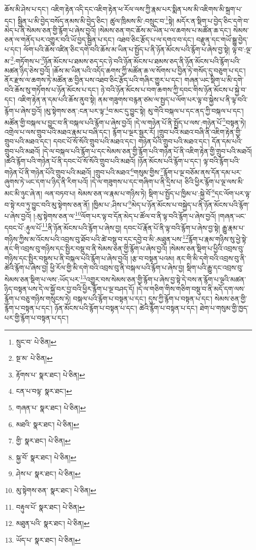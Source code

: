 ཆོས་མི་ཤེས་པ་དང་། འཇིག་རྟེན་འདི་དང་འཇིག་རྟེན་ཕ་རོལ་ལས་ཀྱི་རྣམ་པར་སྨིན་པས་མི་འཇིགས་མི་སྐྲག་པ་དང་། སྦྱིན་པ་མི་བྱེད་བསོད་ནམས་མི་བྱེད་ཅིང་། ཚུལ་ཁྲིམས་མི་:བསྲུང་བ་\footnote{སྲུང་བ་  པེ་ཅིན། }སྟེ། མདོར་ན་སྡིག་པ་བྱེད་ཅིང་དགེ་བ་མེད་པ་ནི་སེམས་ཅན་གྱི་རྙོག་པ་ཞེས་བྱའོ། །སེམས་ཅན་གང་ཆོས་མ་ཡིན་པ་ལ་ཆགས་པ་མཚོན་ཆ་དང་། སེམས་ཅན་ལ་གནོད་པར་འགྱུར་བའི་ཡོ་བྱད་སྦྱིན་པ་དང་། འཐབ་ཅིང་རྩོད་པ་ལ་དགའ་བ་དང་། བརྫུན་དང་གཡོ་སྒྱུ་བྱེད་པ་དང་། ལོག་པའི་ཆོས་འཛིན་ཅིང་དགེ་བའི་ཆོས་མ་ཡིན་པ་སྤྱོད་པ་ནི་ཉོན་མོངས་པའི་རྙོག་པ་ཞེས་བྱ་སྟེ། ལྟ་བ་:ལྔ་མ་\footnote{སྔ་མ་  པེ་ཅིན། }:གཏོགས་པ་\footnote{རྟོགས་པ་  སྣར་ཐང་།  པེ་ཅིན། }ཉོན་མོངས་པ་ཐམས་ཅད་དང་ཉེ་བའི་ཉོན་མོངས་པ་ཐམས་ཅད་ནི་ཉོན་མོངས་པའི་རྙོག་པའི་མཚན་ཉིད་ཅེས་བྱའོ། །ཆོས་མ་ཡིན་པའི་འདོད་ཆགས་ཀྱི་མཚོན་ཆ་ལ་སོགས་པ་བྱིན་ཏེ་གསོད་དུ་བཅུག་པ་དང་། ནོར་རྫས་ལ་ཆགས་ཏེ་མཚོན་ཆ་བྱིན་པས་འཐབ་ཅིང་རྩོད་པའི་གཞིར་གྱུར་པ་དང་། གཞན་ཡང་སྡིག་པ་མི་དགེ་བའི་ཆོས་སུ་གཏོགས་པ་ཉོན་མོངས་པ་དང་། ཉེ་བའི་ཉོན་མོངས་པ་བག་ཆགས་ཀྱི་དབང་གིས་ཉོན་མོངས་པ་སྐྱེ་བ་དང་། འཇིག་རྟེན་ན་དམ་པའི་ཆོས་ནུབ་སྟེ། ནམ་གཟུགས་བརྙན་ཙམ་ལ་སྤྱད་པ་ལོག་པར་ལྟ་བ་སྐྱེས་པ་ནི་ལྟ་བའི་རྙོག་པ་ཞེས་བྱའོ། །མུ་སྟེགས་ཅན་:ངན་པར་ལྟ་\footnote{ངན་པ་བལྟ་  སྣར་ཐང་། }བ་མང་དུ་བྱུང་སྟེ། མུ་གེའི་བསྐལ་པ་དང་ནད་ཀྱི་བསྐལ་པ་དང་། མཚོན་གྱི་བསྐལ་པ་བྱུང་བ་ནི་བསྐལ་པའི་རྙོག་པ་ཞེས་བྱའོ། །དེ་ལ་གཉེན་པོ་ནི་སྤྱོད་པ་ལས་:གཉེན་པོ་\footnote{གཞན་པ་  སྣར་ཐང་།  པེ་ཅིན། }བསྟན་ཏེ། འགྲེལ་པ་ལས་གྲུབ་པའི་མཐའ་རྣམ་པ་བཞི་དང་། རྙོག་པ་ལྔར་སྦྱར་རོ། །གྲུབ་པའི་མཐའ་བཞི་ནི་འཇིག་རྟེན་གྱི་གྲུབ་པའི་མཐའ་དང་། དབང་པོ་སོ་སོའི་གྲུབ་པའི་མཐའ་དང་། གཉེན་པོའི་གྲུབ་པའི་མཐའ་དང་། དོན་དམ་པའི་གྲུབ་པའི་མཐའོ། །དེ་ལ་བསྐལ་པའི་རྙོག་པ་དང་སེམས་ཅན་གྱི་རྙོག་པའི་གཉེན་པོ་ནི་འཇིག་རྟེན་གྱི་གྲུབ་པའི་མཐའོ། །ཚེའི་རྙོག་པའི་གཉེན་པོ་ནི་དབང་པོ་སོ་སོའི་གྲུབ་པའི་མཐའོ། །ཉོན་མོངས་པའི་རྙོག་པ་དང་། ལྟ་བའི་རྙོག་པའི་གཉེན་པོ་ནི་གཉེན་པོའི་གྲུབ་པའི་མཐའོ། །གྲུབ་པའི་མཐའ་\footnote{མཐའི་  སྣར་ཐང་།  པེ་ཅིན། }གསུམ་གྱིས་\footnote{གྱི་  སྣར་ཐང་།  པེ་ཅིན། }རྙོག་པ་ལྔ་བཅོམ་ནས་དོན་དམ་པར་ཞུགས་ཏེ་ཡང་དག་པ་ཉིད་ནི་རིག་པའོ། །དེ་ལ་གཟུགས་པ་དང་གཞིག་པ་ནི་དྲིས་པ། ཅིའི་ཕྱིར་རྙོག་པ་ལྔ་ལས་མི་མང་མི་ཉུང་ཞེ་ན། ལན་བཏབ་པ། སེམས་ཅན་ལ་རྣམ་པ་གཉིས་ཏེ། སྡིག་པ་སྤྱོད་པ་ཁྱིམ་པ་:སྐྱེ་བོ་\footnote{སྐྱ་བོ་  སྣར་ཐང་།  པེ་ཅིན། }དང་ལོག་པར་ལྟ་བ་སྟེ་རབ་ཏུ་བྱུང་བའི་མུ་སྟེགས་ཅན་ནོ། །ཁྱིམ་པ་:ཤིས་པ་\footnote{ཤེས་པ་  སྣར་ཐང་།  པེ་ཅིན། }མེད་པ་ཉོན་མོངས་པ་བསྐྱེད་པ་ནི་ཉོན་མོངས་པའི་རྙོག་པ་ཞེས་བྱའོ། །:མུ་སྟེགས་ཅན་ལ་\footnote{མུ་སྟེགས་ཅན་  སྣར་ཐང་།  པེ་ཅིན། }ལོག་པར་ལྟ་བ་དོན་མེད་པ་ཚོལ་བ་ནི་ལྟ་བའི་རྙོག་པ་ཞེས་བྱའོ། །གཞན་ཡང་དབང་པོ་:རྟུལ་པོ་\footnote{བརྟུལ་པོ་  སྣར་ཐང་།  པེ་ཅིན། }ནི་ཉོན་མོངས་པའི་རྙོག་པ་ཞེས་བྱ། དབང་པོ་རྣོན་པོ་ནི་ལྟ་བའི་རྙོག་པ་ཞེས་བྱ་སྟེ། རྒྱུ་རྣམ་པ་གཉིས་ཀྱིས་མ་འོངས་པའི་འབྲས་བུ་ཐོབ་པའི་ཚེ་བསྡུ་བ་དང་དབྱེ་བ་མི་:མཐུན་པས་\footnote{མཐུན་པའི་  སྣར་ཐང་།  པེ་ཅིན། }རྙོག་པ་རྣམ་གཉིས་སུ་ཕྱེ་སྟེ་ནང་གི་འབྲས་བུ་གཉིས་དང་སྤྱིར་བསྡུ་བ་ནི་སེམས་ཅན་གྱི་རྙོག་པ་ཞེས་བྱའོ། །སེམས་ཅན་སྡིག་པ་ཕྱིའི་འབྲས་བུ་གཉིས་དང་སྤྱིར་བསྡུས་པ་ནི་བསྐལ་པའི་རྙོག་པ་ཞེས་བྱའོ། །རྩ་བ་བསྟན་པའམ། ནང་གི་མི་དགེ་བའི་འབྲས་བུ་ནི་ཚེའི་རྙོག་པ་ཞེས་བྱ། ཕྱི་རོལ་གྱི་མི་དགེ་བའི་འབྲས་བུ་ནི་བསྐལ་པའི་རྙོག་པ་ཞེས་བྱ། སྡིག་པའི་རྒྱུ་དང་འབྲས་བུ་སེམས་ཅན་སྡིག་པ་ལས་:ཡོད་པར་\footnote{ཡོད་པ་  སྣར་ཐང་།  པེ་ཅིན། }འགྱུར་བས་སེམས་ཅན་གྱི་རྙོག་པ་ཞེས་བྱ་སྟེ་དེ་བས་ན་རྙོག་པ་ལྔའི་མཚན་ཉིད་བསྟན་པས་དེ་ལ་སྐྱོ་བར་བྱ་བའི་ཕྱིར་རྙོག་པ་ལྔ་བཤད་དོ། །དེ་ལ་གཅིག་གིས་གཅིག་བསྡུ་བ་ནི་མདོ་དག་ལས་རྙོག་པ་བཅུ་གཉིས་གསུངས་ཏེ། བསྐལ་པའི་རྙོག་པ་བསྟན་པ་དང་། དུས་ཀྱི་རྙོག་པ་བསྟན་པ་དང་། སེམས་ཅན་གྱི་རྙོག་པ་བསྟན་པ་དང་། ཉོན་མོངས་པའི་རྙོག་པ་བསྟན་པ་དང་། ཚེའི་རྙོག་པ་བསྟན་པ་དང་། ཐེག་པ་གསུམ་གྱི་ཁྱད་པར་གྱི་རྙོག་པ་བསྟན་པ་དང་། 